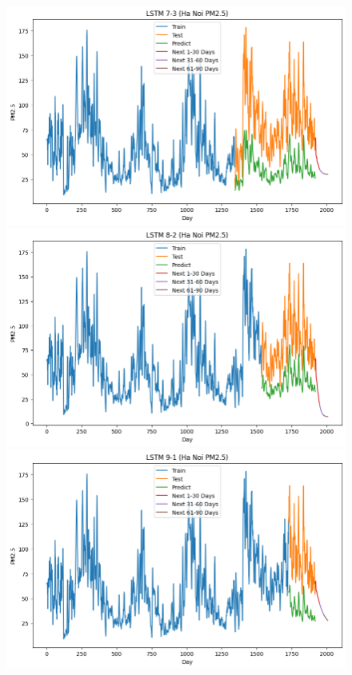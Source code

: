 \begin{figure}[H]
{\begin{adjustbox}{minipage=0.48\textwidth}
\begin{minipage}{0.3\textwidth}
            \end{minipage}\hfill
            \begin{minipage}{0.3\textwidth}
                \centering
                \includegraphics[width=\textwidth, height=0.6\textwidth]{img/final/LSTM/90D/LSTM_7_3_HN.png}\\
                \includegraphics[width=\textwidth, height=0.6\textwidth]{img/final/LSTM/90D/LSTM_8_2_HN.png}\\
                \includegraphics[width=\textwidth, height=0.6\textwidth]{img/final/LSTM/90D/LSTM_9_1_HN.png}

\end{minipage}
\end{adjustbox}}
\end{figure}
